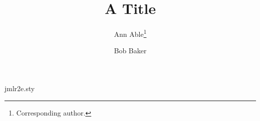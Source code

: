 \begin{filecontents*}[overwrite]{jmlr2e.sty}
\def\maketitle{\par
 \begingroup
   \def\thefootnote{\fnsymbol{footnote}}
   \def\@makefnmark{\hbox to 0pt{$^{\@thefnmark}$\hss}}
   \@maketitle \@thanks
 \endgroup
\setcounter{footnote}{0}
 \let\maketitle\relax \let\@maketitle\relax
 \gdef\@thanks{}\gdef\@author{}\gdef\@title{}\let\thanks\relax}
\def\@maketitle{\vbox{\hsize\textwidth{\begin{center}\Large\bf \@title\par\end{center}}
  {\def\and{\unskip\enspace{\rm and}\enspace}\noindent\normalsize\bf\@author}}}
\end{filecontents*}
\documentclass{article}
\usepackage{jmlr2e}
\title{A Title}
\author{Ann Able\thanks{Corresponding author.} \and Bob Baker}

\maketitle
Body.

